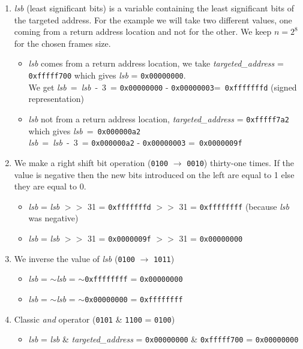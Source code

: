 \documentclass[11pt]{sdm}
\begin{document}
\begin{enumerate}
	\item \textit{lsb} (least significant bits) is a variable containing the least significant bits of the targeted address. For the example we will take two different values, one coming from a return address location and not for the other. We keep $n=2^8$ for the chosen frames size.
		\begin{itemize}
			\item \textit{lsb} comes from a return address location, we take \textit{targeted\_address} = \texttt{0xfffff700} which gives \textit{lsb} = \texttt{0x00000000}.\\
				We get \textit{lsb}~=~\textit{lsb}~-~3~= \texttt{0x00000000} - \texttt{0x00000003}=~\texttt{0xfffffffd} (signed representation)
			\item \textit{lsb} not from a return address location, \textit{targeted\_address} = \texttt{0xfffff7a2} which gives \textit{lsb}~=~\texttt{0x000000a2}\\
\textit{lsb}~=~\textit{lsb}~-~3~= \texttt{0x000000a2} - \texttt{0x00000003} =~\texttt{0x0000009f}
		\end{itemize}
	\item We make a right shift bit operation (\texttt{0100} $\rightarrow$ \texttt{0010}) thirty-one times. If the value is negative then the new bits introduced on the left are equal to 1 else they are equal to 0.
		\begin{itemize}
			\item \textit{lsb} = \textit{lsb} $>>$ 31 = \texttt{0xfffffffd} $>>$ 31 = \texttt{0xffffffff} (because \textit{lsb} was negative)
			\item \textit{lsb} = \textit{lsb} $>>$ 31 = \texttt{0x0000009f} $>>$ 31 = \texttt{0x00000000}
		\end{itemize}
	\item We inverse the value of \textit{lsb} (\texttt{0100} $\rightarrow$ \texttt{1011})
		\begin{itemize}
			\item \textit{lsb} = $\sim$\textit{lsb} = $\sim$\texttt{0xffffffff} = \texttt{0x00000000}
			\item \textit{lsb} = $\sim$\textit{lsb} = $\sim$\texttt{0x00000000} = \texttt{0xffffffff}
		\end{itemize}
	\item Classic \textit{and} operator (\texttt{0101} \& \texttt{1100} = \texttt{0100})
		\begin{itemize}
			\item \textit{lsb} = \textit{lsb} \& \textit{targeted\_address} = \texttt{0x00000000} \& \texttt{0xfffff700} = \texttt{0x00000000}

\end{itemize}
\end{enumerate}
\end{document}
